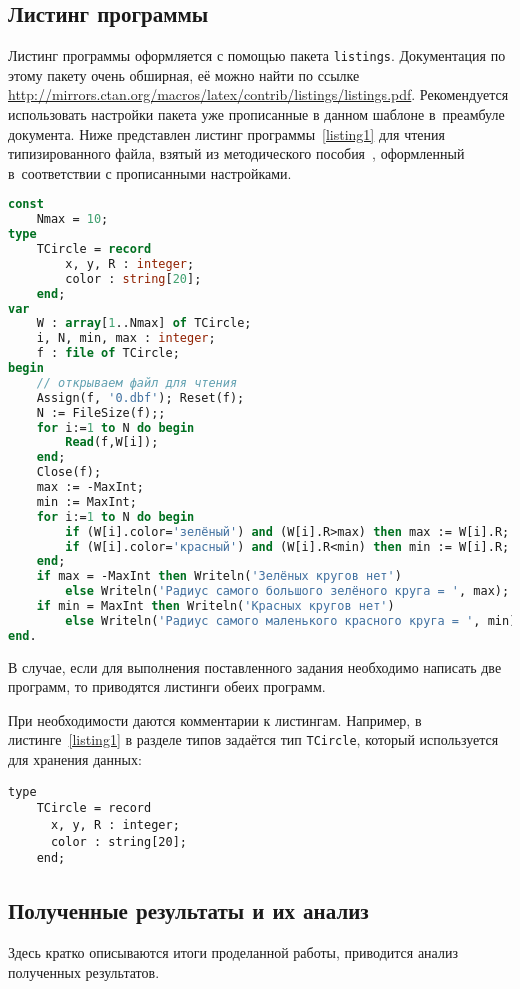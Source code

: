 \subsection{Листинг программы}

Листинг программы оформляется с помощью пакета \verb"listings". 
Документация по этому пакету очень обширная, её можно найти по ссылке \url{http://mirrors.ctan.org/macros/latex/contrib/listings/listings.pdf}.
Рекомендуется использовать настройки пакета уже прописанные в данном шаблоне в~преамбуле документа. 
Ниже представлен листинг программы~\ref{listing1} для чтения типизированного файла, взятый из методического пособия~\cite{gutgut:1}, оформленный в~соответствии с прописанными настройками.

\begin{lstlisting}[language=Pascal]
const
	Nmax = 10;
type
	TCircle = record
		x, y, R : integer;
		color : string[20];
	end;
var
	W : array[1..Nmax] of TCircle;
	i, N, min, max : integer;
	f : file of TCircle;
begin
	// открываем файл для чтения
	Assign(f, '0.dbf'); Reset(f);
	N := FileSize(f);;
	for i:=1 to N do begin
		Read(f,W[i]);
	end;
	Close(f);
	max := -MaxInt;
	min := MaxInt;
	for i:=1 to N do begin
		if (W[i].color='зелёный') and (W[i].R>max) then max := W[i].R;
		if (W[i].color='красный') and (W[i].R<min) then min := W[i].R;
  	end;
  	if max = -MaxInt then Writeln('Зелёных кругов нет')
  		else Writeln('Радиус самого большого зелёного круга = ', max);
	if min = MaxInt then Writeln('Красных кругов нет')
		else Writeln('Радиус самого маленького красного круга = ', min);
end.
\end{lstlisting}

В случае, если для выполнения поставленного задания необходимо написать две программ, то приводятся листинги обеих программ.

При необходимости даются комментарии к листингам. Например, в листинге~\ref{listing1} в разделе типов задаётся тип \verb"TCircle", который используется для хранения данных:
\begin{verbatim}
type
	TCircle = record
      x, y, R : integer;
      color : string[20];
    end;
\end{verbatim}

\subsection{Полученные результаты и их анализ}

Здесь кратко описываются итоги проделанной работы, приводится анализ полученных результатов.


